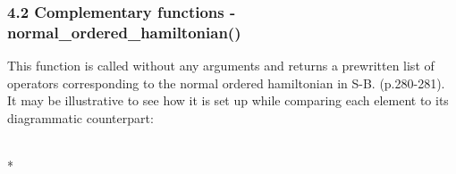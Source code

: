 \documentclass[letterpaper,10pt,english]{/Users/kinealicegulbrandsen/anaconda/lib/python2.7/site-packages/sphinx/texinputs/sphinxhowto}
\def\smaller{\fontsize{9.5pt}{9.5pt}\selectfont}
\begin{document}
\subsubsection{4.2 Complementary functions -
normal\_ordered\_hamiltonian()}\label{complementary-functions---normalux5forderedux5fhamiltonian}

This function is called without any arguments and returns a prewritten
list of operators corresponding to the normal ordered hamiltonian in
S-B. (p.280-281). It may be illustrative to see how it is set up while
comparing each element to its diagrammatic counterpart:


    
        \vspace{6pt}
        \makebox[0.1\linewidth]{\smaller\hfill\tt\color{nbframe-in-prompt}In\hspace{4pt}{[}12{]}:\hspace{4pt}}\\*
        \vspace{-2.65\baselineskip}
\end{document}
